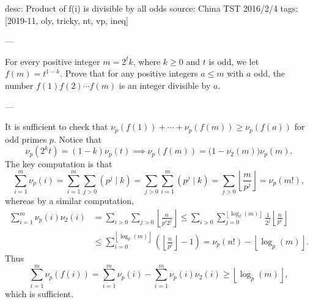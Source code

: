 desc: Product of f(i) is divisible by all odds
source: China TST 2016/2/4
tags: [2019-11, oly, tricky, nt, vp, ineq]

---

For every positive integer $m=2^tk$, where $k\ge0$ and $t$ is odd, we let $f(m)=t^{1-k}$. Prove that for any positive integers $a\le m$ with $a$ odd, the number $f(1)f(2)\cdots f(m)$ is an integer divisible by $a$.

---

It is sufficient to check that $\nu_p(f(1))+\cdots+\nu_p(f(m))\ge\nu_p(f(a))$ for odd primes $p$. Notice that \[\nu_p(2^kt)=(1-k)\nu_p(t)\implies\nu_p(f(m))=\big(1-\nu_2(m)\big)\nu_p(m).\]
The key computation is that \[\sum_{i=1}^m\nu_p(i)=\sum_{i=1}^m\sum_{j>0}\left(p^j\mid k\right)=\sum_{j>0}\sum_{i=1}^m\left(p^j\mid k\right)=\sum_{j>0}\left\lfloor\frac m{p^j}\right\rfloor=\nu_p(m!),\]
whereas by a similar computation,
\begin{align*}
\sum_{i=1}^m\nu_p(i)\nu_2(i)&=\sum_{i>0}\sum_{j>0}\left\lfloor\frac n{p^i2^j}\right\rfloor\le\sum_{i>0}\sum_{j=0}^{\left\lfloor\log_2(m)\right\rfloor}\frac1{2^j}\left\lfloor \frac n{p^i}\right\rfloor\\
&\le\sum_{i=0}^{\left\lfloor\log_p(m)\right\rfloor}\left(\left\lfloor\frac n{p^i}\right\rfloor-1\right)=\nu_p(n!)-\left\lfloor\log_p(m)\right\rfloor.
\end{align*}
Thus \[\sum_{i=1}^m\nu_p(f(i))=\sum_{i=1}^m\nu_p(i)-\sum_{i=1}^m\nu_p(i)\nu_2(i)\ge\left\lfloor\log_p(m)\right\rfloor,\]
which is sufficient.
